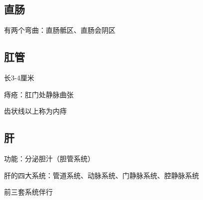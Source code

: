 \subsection{直肠}%
\label{sub:直肠}
有两个弯曲：直肠骶区、直肠会阴区
\subsection{肛管}%
\label{sub:肛管}
长3-4厘米
\begin{notation}
    痔疮：肛门处静脉曲张

    齿状线以上称为内痔
\end{notation}
\subsection{肝}%
\label{sub:肝}
功能：分泌胆汁（胆管系统）

肝的四大系统：管道系统、动脉系统、门静脉系统、腔静脉系统
\begin{notation}
    前三套系统伴行
\end{notation}



